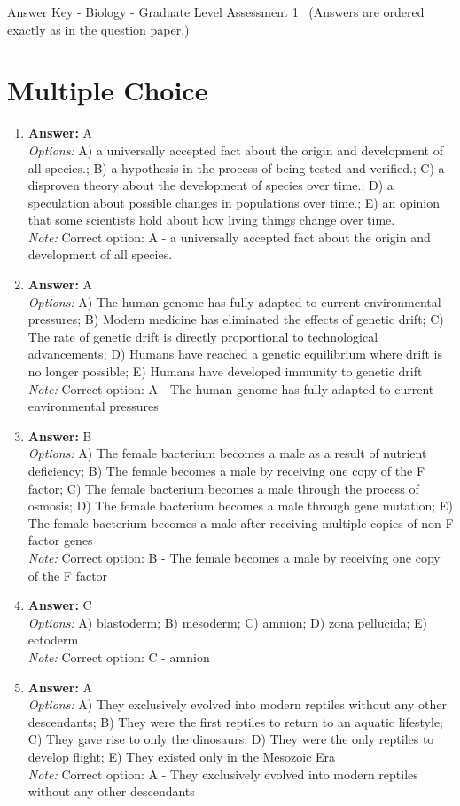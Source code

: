 \documentclass[12pt]{article}
\begin{document}
\begin{center}
Answer Key - Biology - Graduate Level Assessment 1 \
\small (Answers are ordered exactly as in the question paper.)
\end{center}

\section*{Multiple Choice}
\begin{enumerate}[label=\arabic*.]
\item \textbf{Answer:} A
\\ \textit{Options:} A) a universally accepted fact about the origin and development of all species.; B) a hypothesis in the process of being tested and verified.; C) a disproven theory about the development of species over time.; D) a speculation about possible changes in populations over time.; E) an opinion that some scientists hold about how living things change over time.
\\ \textit{Note:} Correct option: A - a universally accepted fact about the origin and development of all species.
\item \textbf{Answer:} A
\\ \textit{Options:} A) The human genome has fully adapted to current environmental pressures; B) Modern medicine has eliminated the effects of genetic drift; C) The rate of genetic drift is directly proportional to technological advancements; D) Humans have reached a genetic equilibrium where drift is no longer possible; E) Humans have developed immunity to genetic drift
\\ \textit{Note:} Correct option: A - The human genome has fully adapted to current environmental pressures
\item \textbf{Answer:} B
\\ \textit{Options:} A) The female bacterium becomes a male as a result of nutrient deficiency; B) The female becomes a male by receiving one copy of the F factor; C) The female bacterium becomes a male through the process of osmosis; D) The female bacterium becomes a male through gene mutation; E) The female bacterium becomes a male after receiving multiple copies of non-F factor genes
\\ \textit{Note:} Correct option: B - The female becomes a male by receiving one copy of the F factor
\item \textbf{Answer:} C
\\ \textit{Options:} A) blastoderm; B) mesoderm; C) amnion; D) zona pellucida; E) ectoderm
\\ \textit{Note:} Correct option: C - amnion
\item \textbf{Answer:} A
\\ \textit{Options:} A) They exclusively evolved into modern reptiles without any other descendants; B) They were the first reptiles to return to an aquatic lifestyle; C) They gave rise to only the dinosaurs; D) They were the only reptiles to develop flight; E) They existed only in the Mesozoic Era
\\ \textit{Note:} Correct option: A - They exclusively evolved into modern reptiles without any other descendants
\end{enumerate}
\end{document}
